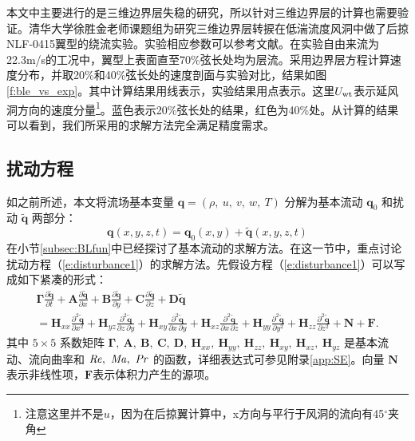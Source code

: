 本文中主要进行的是三维边界层失稳的研究，所以针对三维边界层的计算也需要验证。清华大学徐胜金老师课题组为研究三维边界层转捩在低湍流度风洞中做了后掠NLF-0415翼型的绕流实验。实验相应参数可以参考文献\cite{wang2018}。在实验自由来流为22.3m/s的工况中，翼型上表面直至70\%弦长处均为层流。采用边界层方程计算速度分布，并取20\%和40\%弦长处的速度剖面与实验对比，结果如图\ref{f:ble_vs_exp}。其中计算结果用线表示，实验结果用点表示。这里$U_{\rm wt}$表示延风洞方向的速度分量\footnote{注意这里并不是$u$，因为在后掠翼计算中，x方向与平行于风洞的流向有45$^\circ$夹角}。蓝色表示20\%弦长处的结果，红色为40\%处。从计算的结果可以看到，我们所采用的求解方法完全满足精度需求。

\subsection{扰动方程}\label{subsec:STBfun}
如之前所述，本文将流场基本变量 $\mathbf{q}=(\rho,~u,~v,~w,~T)$ 分解为基本流动 $\mathbf{q}_0$ 和扰动 $\tilde{\mathbf{q}}$ 两部分：
\begin{equation}\label{EQ_STa}
\mathbf{q}(x,y,z,t)=\mathbf{q}_0(x,y)
+\tilde{\mathbf{q}}(x,y,z,t)
\end{equation}
在小节\ref{subsec:BLfun}中已经探讨了基本流动的求解方法。在这一节中，重点讨论扰动方程（\ref{e:disturbance1}）的求解方法。先假设方程（\ref{e:disturbance1}）可以写成如下紧凑的形式：
\begin{multline}
 \label{e:EQ_ST}
 {\mathbf{\Gamma }}\frac{{\partial {\mathbf{\tilde q}}}}
 {{\partial t}} + {\mathbf{A}}\frac{{\partial {\mathbf{\tilde q}}}}
 {{\partial x}} + {\mathbf{B}}\frac{{\partial {\mathbf{\tilde q}}}}
 {{\partial y}} + {\mathbf{C}}\frac{{\partial {\mathbf{\tilde q}}}}
 {{\partial z}} + {\mathbf{D\tilde q}}\\ = {\mathbf{H}}_{xx} \frac{{\partial ^2 {\mathbf{\tilde q}}}}
 {{\partial x^2 }} + {\mathbf{H}}_{yz} \frac{{\partial ^2 {\mathbf{\tilde q}}}}
 {{\partial z\,\partial y}} + {\mathbf{H}}_{xy} \frac{{\partial ^2 {\mathbf{\tilde q}}}}
 {{\partial x\,\partial y}} + {\mathbf{H}}_{xz} \frac{{\partial ^2 {\mathbf{\tilde q}}}}
 {{\partial x\,\partial z}} + {\mathbf{H}}_{yy} \frac{{\partial ^2 {\mathbf{\tilde q}}}}
 {{\partial y^2 }} + {\mathbf{H}}_{zz} \frac{{\partial ^2 {\mathbf{\tilde q}}}}
 {{\partial z^2 }} + {\mathbf{N}} + {\mathbf{F}}.
\end{multline}
其中 $5\times5$ 系数矩阵 $\mathbf{\Gamma},~\mathbf{A},~\mathbf{B},~
\mathbf{C},~\mathbf{D},~\mathbf{H}_{xx},~
\mathbf{H}_{yy},~\mathbf{H}_{zz},~\mathbf{H}_{xy},~
\mathbf{H}_{xz},~\mathbf{H}_{yz}$ 是基本流动、流向曲率和 $\mbox{{\textit{Re}}},~\mbox{{\textit{Ma}}},~\mbox{{\textit{Pr}}}$ 的函数，详细表达式可参见附录\ref{app:SE}。向量 $\mathbf{{N}}$ 表示非线性项，$\mathbf{F}$表示体积力产生的源项。


